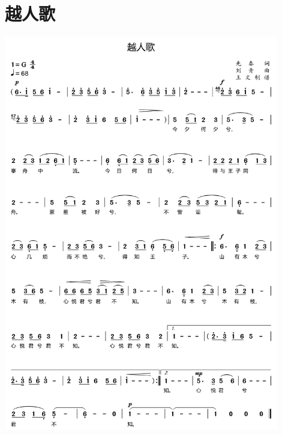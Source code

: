 \documentclass[cn,pad,twocol]{elegantbook}
\begin{document}
\section{越人歌} \includegraphics[width=0.9\textwidth]{macos/20210208越人歌.png}
\end{document}
